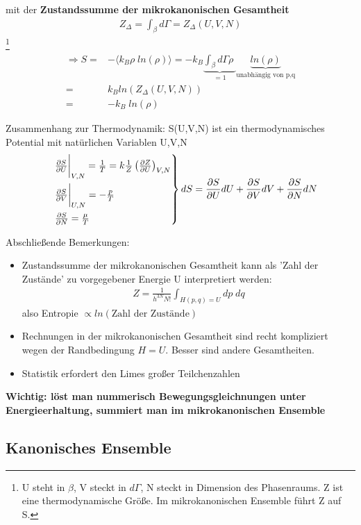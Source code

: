 \documentclass[12pt]{article}
\begin{document}
mit der \textbf{Zustandssumme der mikrokanonischen Gesamtheit}
\begin{align}
Z_\Delta = \int_\beta d\Gamma = Z_\Delta (U,V,N) 
\end{align} \footnote{U steht in $\beta$, V steckt in $d\Gamma$, N steckt in Dimension des Phasenraums. Z ist eine thermodynamische Größe. Im mikrokanonischen Ensemble führt Z auf S.}
\begin{align}
\Rightarrow S =& - \langle k_B \rho \; ln(\rho ) \rangle = - k_B \underbrace{\int_\beta d\Gamma \rho \; }_{=1} \underbrace{ln(\rho)}_\text{unabhängig von p,q} \\
=& k_B ln (Z_\Delta(U,V,N)) \\
=& - k_B \; ln(\rho )
\end{align}

Zusammenhang zur Thermodynamik: S(U,V,N) ist ein thermodynamisches Potential mit natürlichen Variablen U,V,N
\begin{align}
\begin{rcases}
& \frac{\partial S}{\partial U} \biggr\vert_{V,N} = \frac{1}{T} = k \frac{1}{Z} \left( \frac{\partial Z}{\partial U}\right)_{V,N} \\
& \frac{\partial S}{\partial V} \biggr\vert_{U,N} =  -\frac{p}{T} \\
& \frac{\partial S}{\partial N} = \frac{\mu }{T}
\end{rcases}
 dS = \frac{\partial S}{\partial U} dU +\frac{\partial S}{\partial V}dV+  \frac{\partial S}{\partial N} dN
\end{align}

Abschließende Bemerkungen: 
\begin{itemize}
\item Zustandssumme der mikrokanonischen Gesamtheit kann als 'Zahl der Zustände' zu vorgegebener Energie U interpretiert werden: 
\begin{align}
Z = \frac{1}{h^{3N} N!} \int_{H(p,q)=U} dp \; dq
\end{align}
also Entropie $\propto ln(\mbox{Zahl der Zustände})$
\item Rechnungen in der mikrokanonischen Gesamtheit sind recht kompliziert wegen der Randbedingung $H=U$. Besser sind andere Gesamtheiten. 
\item Statistik erfordert den Limes großer Teilchenzahlen
\end{itemize}
\textbf{Wichtig: löst man nummerisch Bewegungsgleichnungen unter Energieerhaltung, summiert man im mikrokanonischen Ensemble}
\subsection{Kanonisches Ensemble}
\end{document}
